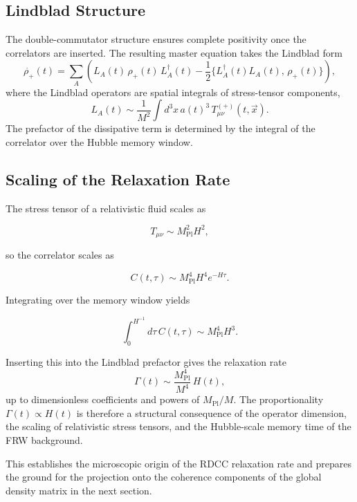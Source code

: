 \documentclass[11pt,a4paper]{article}
\newcommand{\rplus}{\rho_+}
\newcommand{\Tplus}{T^{(+)}_{\mu\nu}}
\begin{document}
\subsection{Lindblad Structure}

The double-commutator structure ensures complete positivity once the correlators
are inserted. The resulting master equation takes the Lindblad form
\begin{equation}
\dot{\rplus}(t)
    = \sum_{A}
      \left(
          L_{A}(t)\, \rplus(t)\, L_{A}^{\dagger}(t)
          - \frac{1}{2}
            \{ L_{A}^{\dagger}(t) L_{A}(t),\, \rplus(t) \}
      \right),
\end{equation}
where the Lindblad operators are spatial integrals of stress-tensor components,
\begin{equation}
L_{A}(t)
    \sim \frac{1}{M^{2}}
         \int d^{3}x\, a(t)^{3}\, \Tplus(t,\vec{x}).
\end{equation}
The prefactor of the dissipative term is determined by the integral of the
correlator over the Hubble memory window.

\subsection{Scaling of the Relaxation Rate}

The stress tensor of a relativistic fluid scales as


\[
T_{\mu\nu} \sim M_{\mathrm{Pl}}^{2} H^{2},
\]


so the correlator scales as


\[
C(t,\tau) \sim M_{\mathrm{Pl}}^{4} H^{4} e^{-H\tau}.
\]


Integrating over the memory window yields


\[
\int_{0}^{H^{-1}} d\tau\, C(t,\tau)
    \sim M_{\mathrm{Pl}}^{4} H^{3}.
\]


Inserting this into the Lindblad prefactor gives the relaxation rate
\begin{equation}
\Gamma(t)
    \sim \frac{M_{\mathrm{Pl}}^{4}}{M^{4}}\, H(t),
\end{equation}
up to dimensionless coefficients and powers of \(M_{\mathrm{Pl}}/M\). The
proportionality \(\Gamma(t) \propto H(t)\) is therefore a structural consequence
of the operator dimension, the scaling of relativistic stress tensors, and the
Hubble-scale memory time of the FRW background.

This establishes the microscopic origin of the RDCC relaxation rate and prepares
the ground for the projection onto the coherence components of the global density
matrix in the next section.
\end{document}
